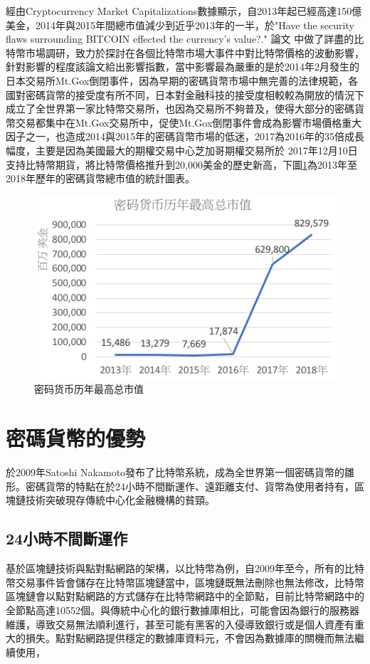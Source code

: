 	經由Cryptocurrency Market Capitalizations數據顯示，自2013年起已經高達150億美金，2014年與2015年間總市值減少到近乎2013年的一半，於"Have the security flaws surrounding BITCOIN effected the currency's value?."
	論文\parencite{HavethesecurityflawssurroundingBITCOINeffectedthecurrencysvalue?}
	中做了詳盡的比特幣市場調研，致力於探討在各個比特幣市場大事件中對比特幣價格的波動影響，針對影響的程度該論文給出影響指數，當中影響最為嚴重的是於2014年2月發生的日本交易所Mt.Gox倒閉事件，因為早期的密碼貨幣市場中無完善的法律規範，各國對密碼貨幣的接受度有所不同，日本對金融科技的接受度相較較為開放的情況下成立了全世界第一家比特幣交易所，也因為交易所不夠普及，使得大部分的密碼貨幣交易都集中在Mt.Gox交易所中，促使Mt.Gox倒閉事件會成為影響市場價格重大因子之一，也造成2014與2015年的密碼貨幣市場的低迷，2017為2016年的35倍成長幅度，主要是因為美國最大的期權交易中心芝加哥期權交易所於	2017年12月10日支持比特幣期貨，將比特幣價格推升到20,000美金的歷史新高，下圖\ref{Thetotalmarketcapitalization}為2013年至2018年歷年的密碼貨幣總市值的統計圖表。

		\begin{figure}[h]
			\centering
			\includegraphics[width = .7\textwidth]{Thetotalmarketcapitalization.png}
			\caption{密码货币历年最高总市值\parencite{CryptocurrencyMarketCapitalizations}}\label{Thetotalmarketcapitalization}
		\end{figure}
	

	\section{密碼貨幣的優勢}
	於2009年Satoshi Nakamoto發布了比特幣系統，成為全世界第一個密碼貨幣的雛形。密碼貨幣的特點在於24小時不間斷運作、遠距離支付、貨幣為使用者持有，區塊鏈技術突破現存傳統中心化金融機構的貧頸。

		\subsection{24小時不間斷運作}
		基於區塊鏈技術與點對點網路的架構，以比特幣為例，自2009年至今，所有的比特幣交易事件皆會儲存在比特幣區塊鏈當中，區塊鏈既無法刪除也無法修改，比特幣區塊鏈會以點對點網路的方式儲存在比特幣網路中的全節點，目前比特幣網路中的全節點高達10552個。與傳統中心化的銀行數據庫相比，可能會因為銀行的服務器維護，導致交易無法順利進行，甚至可能有黑客的入侵導致銀行或是個人資產有重大的損失。點對點網路提供穩定的數據庫資料元，不會因為數據庫的關機而無法繼續使用，
		
